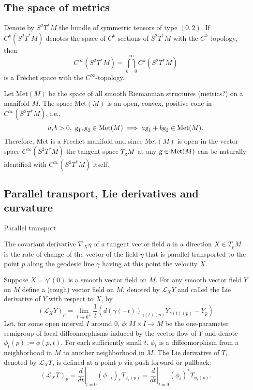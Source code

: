 \documentclass{article}
\theoremstyle{plain}
\theoremstyle{definition}
\newcommand{\g}{\ensuremath{\textsl{g}}}
\newcommand{\Met}{\ensuremath{\mathrm{Met}}}
\newcommand{\lie}{\ensuremath{\mathcal{L}}}
\begin{document}
\subsection{The space of metrics}
Denote by $S^2T^*M$ the bundle of  symmetric tensors of type $(0,2)$. If $C^k(S^2T^*M)$ denotes the space of $C^k$ sections of  $S^2T^*M$ with the $C^k$-topology, then
\[
C^\infty (S^2T^*M) = \bigcap_{k=0}^\infty C^k(S^2T^*M)
\]
is a Fréchet space with the $C^\infty$-topology.

Let $\Met(M)$ be the space of all smooth Riemannian structures (metrics?) on a manifold $M$.
The space $\Met(M)$ is an open, convex, positive cone in $C^\infty(S^2T^*M)$, i.e.,
\[
a,b>0,\ \g_1,\g_2\in \Met(M) \implies a\g_1+b\g_2\in\Met(M).
\]
Therefore, $\Met$ is a Frechet manifold and since $\Met(M)$ is open in the vector space $C^\infty (S^2T^*M)$  the tangent space $T_\g M$ at any $\g\in \Met(M)$ can be naturally identified with $C^\infty (S^2T^*M)$ itself.

\subsection{Parallel transport, Lie derivatives and curvature}
Parallel transport

The covariant derivative $\nabla_X\eta$ of a tangent vector field $\eta$ in a
direction $X\in T_pM$ is the rate of change of the vector of the field $\eta$ that is parallel transported to the point $p$ along the geodesic line $\gamma$ having at this point the velocity $X$.

Suppose $X=\gamma'(0)$ is a smooth vector field on $M$. %
For any smooth vector field $Y$ on $M$ define a (rough) vector field on $M$, denoted by $\lie_XY$ and called the Lie derivative of $Y$ with respect to $X$, by
\[
(\lie_XY)_p = \lim_{t\to 0^+}\frac{1}{t}\left(d(\gamma(-t))_{\gamma(t)(p)}Y_{\gamma(t)(p)}-Y_p\right)
\]
Let, for some open interval $I$ around $0$, $\phi : M \times I \to M$ be the one-parameter semigroup of local diffeomorphisms induced by the vector flow of $Y$ and denote $\phi_t(p) := \phi(p, t)$. For each sufficiently small $t$, $\phi_t$ is a diffeomorphism from a neighborhood in $M$ to another neighborhood in $M$. The Lie derivative of $T$, denoted by $\lie_XT$, is defined at a point $p$ via push forward or pullback: 
\[
(\lie_XT)_p = \left.\frac{d}{dt}\right|_{t=0} (\phi_{-t})_*T_{\phi_t(p)}=\left.\frac{d}{dt}\right|_{t=0} (\phi_{t})^*T_{\phi_t(p)}.
\]
\end{document}
